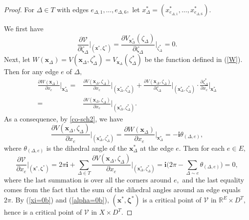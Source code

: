 \documentclass[11pt]{article}
\theoremstyle{remark}
\theoremstyle{remark}
\numberwithin{equation}{section}
\begin{document}
\begin{proof}  For $\Delta\in T$ with edges $e_{\Delta,1},\dots,e_{\Delta,6},$ let $x^*_{ \Delta}=(x^*_{ e_{\Delta,1}},\dots,x^*_{ e_{\Delta,6}}).$ 

We first have
\begin{equation}\label{xi=0b}
\frac{\partial  \mathcal V}{\partial \zeta_\Delta}\Big|_{(\boldsymbol x^* ,\boldsymbol \zeta^* )}=\frac{\partial V_{\boldsymbol x^*_{ \Delta}}(\zeta_\Delta)}{\partial \zeta_\Delta}\Big|_{\zeta^*_{ \Delta}}=0.
\end{equation}
Next,  let $W(\boldsymbol x_\Delta)=V(\boldsymbol x_\Delta,\zeta^*_\Delta)=V_{\boldsymbol x_\Delta}(\zeta^*_\Delta)$ be the function defined in (\ref{W}). Then for any edge $e$ of $\Delta,$ 
\begin{equation*}
\begin{split}
\frac{\partial W(\boldsymbol x_\Delta)}{\partial x_e}\Big|_{\boldsymbol x^*_{ \Delta}}=&\frac{\partial V(\boldsymbol x_\Delta,\zeta_\Delta)}{\partial x_e}\Big|_{(\boldsymbol x^*_{ \Delta},\zeta^*_{ \Delta})}+\frac{\partial V(\boldsymbol x_\Delta,\zeta_\Delta)}{\partial \zeta_\Delta}\Big|_{(\boldsymbol x^*_{ \Delta},\zeta^*_{ \Delta})}\cdot\frac{\partial \zeta^*_\Delta}{\partial x_e}\Big|_{\boldsymbol x^*_{ \Delta}}\\
=&\frac{\partial V(\boldsymbol x_\Delta,\zeta_\Delta)}{\partial x_e}\Big|_{(\boldsymbol x^*_{ \Delta},\zeta^*_{ \Delta})}.
\end{split}
\end{equation*}
As a consequence, by \eqref{co-sch2}, we have
\begin{equation*}
\frac{\partial V(\boldsymbol x_\Delta,\zeta_\Delta)}{\partial x_e}\Big|_{(\boldsymbol x^*_{ \Delta},\zeta^*_{ \Delta})}=
\frac{\partial W(\boldsymbol x_\Delta)}{\partial x_e}\Big|_{\boldsymbol x^*_{ \Delta}}=-\mathbf i \theta_{(\Delta,e)},
\end{equation*}
where
$\theta_{(\Delta,e)}$ is the  dihedral angle of the $\boldsymbol x^*_{ \Delta}$ at the edge $e.$ Then for each $e\in E,$ 
\begin{equation}\label{alpha=0b}
\frac{\partial  \mathcal V}{\partial x_e}\Big|_{(\boldsymbol x^* ,\boldsymbol \zeta^* )}=2\pi\mathbf i+ \sum_{\Delta\in T}\frac{\partial V(\boldsymbol x_\Delta,\zeta_\Delta)}{\partial x_e}\Big|_{(\boldsymbol x^*_{ \Delta},\zeta^*_{ \Delta})}=\mathbf i\Big(2\pi-\sum_{\Delta\sim e} \theta_{(\Delta,e)}\Big)=0,
\end{equation}
where the last summation is over all the corners around $e,$ and the last equality comes from the fact that the sum of the dihedral angles around an edge equals $2\pi.$ By (\ref{xi=0b}) and (\ref{alpha=0b}), $(\boldsymbol x^* ,\boldsymbol \zeta^* )$ is a critical point of $ \mathcal V$ in $\mathbb R^E\times D^T,$ hence is a critical point of $\mathcal V$ in $X\times D^T.$ 




\end{proof}
\end{document}

